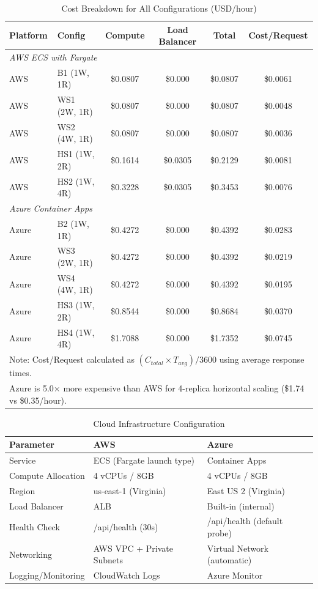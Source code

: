 \begin{table}[!htbp]
\centering
\caption{Cost Breakdown for All Configurations (USD/hour)}
\label{tab:cost_breakdown}
\begin{tabular}{llcccc}
\toprule
\textbf{Platform} & \textbf{Config} & \textbf{Compute} & \textbf{Load Balancer} & \textbf{Total} & \textbf{Cost/Request} \\
\midrule
\multicolumn{6}{l}{\textit{AWS ECS with Fargate}} \\
AWS & B1 (1W, 1R) & \$0.0807 & \$0.000 & \$0.0807 & \$0.0061 \\
AWS & WS1 (2W, 1R) & \$0.0807 & \$0.000 & \$0.0807 & \$0.0048 \\
AWS & WS2 (4W, 1R) & \$0.0807 & \$0.000 & \$0.0807 & \$0.0036 \\
AWS & HS1 (1W, 2R) & \$0.1614 & \$0.0305 & \$0.2129 & \$0.0081 \\
AWS & HS2 (1W, 4R) & \$0.3228 & \$0.0305 & \$0.3453 & \$0.0076 \\
\midrule
\multicolumn{6}{l}{\textit{Azure Container Apps}} \\
Azure & B2 (1W, 1R) & \$0.4272 & \$0.000 & \$0.4392 & \$0.0283 \\
Azure & WS3 (2W, 1R) & \$0.4272 & \$0.000 & \$0.4392 & \$0.0219 \\
Azure & WS4 (4W, 1R) & \$0.4272 & \$0.000 & \$0.4392 & \$0.0195 \\
Azure & HS3 (1W, 2R) & \$0.8544 & \$0.000 & \$0.8684 & \$0.0370 \\
Azure & HS4 (1W, 4R) & \$1.7088 & \$0.000 & \$1.7352 & \$0.0745 \\
\bottomrule
\multicolumn{6}{l}{\footnotesize Note: Cost/Request calculated as $(C_{total} \times T_{avg}) / 3600$ using average response times.} \\
\multicolumn{6}{l}{\footnotesize Azure is 5.0× more expensive than AWS for 4-replica horizontal scaling (\$1.74 vs \$0.35/hour).} \\
\end{tabular}
\end{table}

\begin{table}[!htbp]
\centering
\caption{Cloud Infrastructure Configuration}
\label{tab:infrastructure}
\begin{tabular}{lll}
\toprule
\textbf{Parameter} & \textbf{AWS} & \textbf{Azure} \\
\midrule
Service & ECS (Fargate launch type) & Container Apps \\
Compute Allocation & 4 vCPUs / 8GB & 4 vCPUs / 8GB \\
Region & us-east-1 (Virginia) &  East US 2 (Virginia) \\
Load Balancer & ALB & Built-in (internal) \\
Health Check & /api/health (30s) & /api/health (default probe) \\
Networking & AWS VPC + Private Subnets & Virtual Network (automatic) \\
Logging/Monitoring & CloudWatch Logs & Azure Monitor \\
\bottomrule
\end{tabular}
\end{table}

